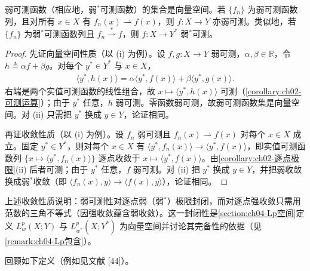 \documentclass[../../main.tex]{subfiles}%
\begin{document}
\begin{remark}\label{remark:ch04-弱可测空间}
弱可测函数（相应地，弱$^*$可测函数）的集合是向量空间。若 $\{f_n\}$ 为弱可测函数列，且对所有 $x\in X$ 有 $f_n(x)\rightharpoonup f(x)$，则 $f:X\to Y$ 亦弱可测。类似地，若 $\{f_n\}$ 为弱$^*$可测函数列且 $f_n\overset{*}{\rightharpoonup}f$，则 $f:X\to Y^*$ 弱$^*$可测。
\end{remark}

\begin{proof}
先证向量空间性质（以 (i) 为例）。设 $f,g:X\to Y$ 弱可测，$\alpha,\beta\in\mathbb{R}$，令 $h\triangleq\alpha f+\beta g$。对每个 $y^*\in Y^*$ 与 $x\in X$，
\begin{align*}
\langle y^*,h(x)\rangle=\alpha\langle y^*,f(x)\rangle+\beta\langle y^*,g(x)\rangle.
\end{align*}
右端是两个实值可测函数的线性组合，故 $x\mapsto\langle y^*,h(x)\rangle$ 可测（\cref{corollary:ch02-可测运算}）；由于 $y^*$ 任意，$h$ 弱可测。零函数弱可测，故弱可测函数集是向量空间。对 (ii) 只需把 $y^*$ 换成 $y\in Y$，论证相同。

再证收敛性质（以 (i) 为例）。设 $f_n$ 弱可测且 $f_n(x)\rightharpoonup f(x)$ 对每个 $x\in X$ 成立。固定 $y^*\in Y^*$，则对每个 $x\in X$ 有 $\langle y^*,f_n(x)\rangle\to\langle y^*,f(x)\rangle$，即实值可测函数列 $\{x\mapsto\langle y^*,f_n(x)\rangle\}$ 逐点收敛于 $x\mapsto\langle y^*,f(x)\rangle$。由\cref{corollary:ch02-逐点极限}(ii) 后者可测；由于 $y^*$ 任意，$f$ 弱可测。对 (ii) 把 $y^*$ 换成 $y\in Y$，并把弱收敛换成弱$^*$收敛（即 $\langle f_n(x),y\rangle\to\langle f(x),y\rangle$），论证相同。
\end{proof}

\begin{remark}\label{remark:ch04-弱可测空间注}
上述收敛性质说明：弱可测性对逐点弱（弱$^*$）极限封闭，而对逐点强收敛只需用范数的三角不等式（因强收敛蕴含弱收敛）。这一封闭性是\cref{section:ch04-Lp空间}定义 $L^p_w(X;Y)$ 与 $L^p_{w^*}(X;Y^*)$ 为向量空间并讨论其完备性的依据（见\cref{remark:ch04-Lp包含}）。
\end{remark}

回顾如下定义（例如见文献 [44]）。
\end{document}
